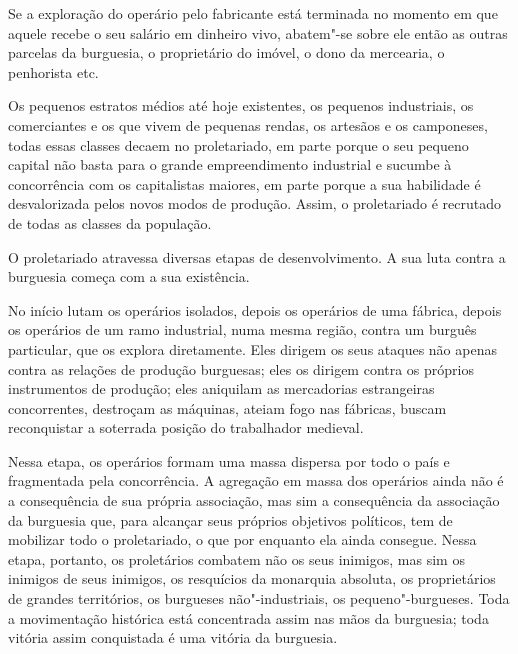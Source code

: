 Se a exploração do operário pelo fabricante está terminada no momento em
que aquele recebe o seu salário em dinheiro vivo, abatem"-se sobre ele
então as outras parcelas da burguesia, o proprietário do imóvel, o dono
da mercearia, o penhorista etc.

Os pequenos estratos médios até hoje existentes, os pequenos
industriais, os comerciantes e os que vivem de pequenas rendas, os
artesãos e os camponeses, todas essas classes decaem no proletariado,
em parte porque o seu pequeno capital não basta para o grande
empreendimento industrial e sucumbe à concorrência com os capitalistas
maiores, em parte porque a sua habilidade é desvalorizada pelos novos
modos de produção. Assim, o proletariado é recrutado de todas as classes
da população.

O proletariado atravessa diversas etapas de desenvolvimento. A sua luta
contra a burguesia começa com a sua existência.

No início lutam os operários isolados, depois os operários de uma   \label{6}
fábrica, depois os operários de um ramo industrial, numa mesma região,
contra um burguês particular, que os explora diretamente. Eles dirigem
os seus ataques não apenas contra as relações de produção burguesas;
eles os dirigem contra os próprios instrumentos de produção; eles
aniquilam as mercadorias estrangeiras concorrentes, destroçam as
máquinas, ateiam fogo nas fábricas, buscam reconquistar a soterrada
posição do trabalhador medieval.

Nessa etapa, os operários formam uma massa dispersa por todo o país e
fragmentada pela concorrência. A agregação em massa dos operários ainda
não é a consequência de sua própria associação, mas sim a consequência
da associação da burguesia que, para alcançar seus próprios objetivos
políticos, tem de mobilizar todo o proletariado, o que por enquanto ela
ainda consegue. Nessa etapa, portanto, os proletários combatem não os
seus inimigos, mas sim os inimigos de seus inimigos, os resquícios da
monarquia absoluta, os proprietários de grandes territórios, os
burgueses não"-industriais, os pequeno"-burgueses. Toda a movimentação
histórica está concentrada assim nas mãos da burguesia; toda vitória
assim conquistada é uma vitória da burguesia.

